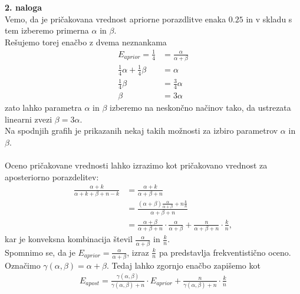 \documentclass[a4paper,11pt]{article}
\begin{document}
\noindent
\textbf{2. naloga}
\\
Vemo, da je pričakovana vrednost apriorne porazdlitve enaka $0.25$ in v skladu s tem izberemo primerna $\alpha$ in $\beta$.
\\
Rešujemo torej enačbo z dvema neznankama
\begin{align*}
    E_{aprior} = \frac{1}{4} &= \frac{\alpha}{\alpha + \beta}
    \\
    \frac{1}{4} \alpha + \frac{1}{4} \beta &= \alpha
    \\
    \frac{1}{4} \beta &=\frac{3}{4} \alpha
    \\
    \beta &= 3 \alpha
\end{align*}
zato lahko parametra $\alpha$ in $\beta$ izberemo na neskončno načinov tako, da ustrezata linearni zvezi $ \beta = 3 \alpha$.
\\
Na spodnjih grafih je prikazanih nekaj takih možnosti za izbiro parametrov $\alpha$ in $\beta$.
\\
\\
Oceno pričakovane vrednosti lahko izrazimo kot pričakovano vrednost za aposteriorno porazdelitev: 
\begin{align*} 
    \frac{\alpha + k}{\alpha + k + \beta + n - k} &= \frac{\alpha + k}{\alpha + \beta + n} 
    \\
    &= \frac{(\alpha + \beta) \frac{\alpha}{\alpha + \beta} + n \frac{k}{n}}{\alpha + \beta + n}
    \\
    &= \frac{\alpha + \beta}{\alpha + \beta + n} \cdot \frac{\alpha}{\alpha + \beta} + \frac{n}{\alpha + \beta + n} \cdot \frac{k}{n},
\end{align*}
kar je konveksna kombinacija števil $\frac{\alpha}{\alpha + \beta}$ in $\frac{k}{n}$.
\\
Spomnimo se, da je $E_{aprior} = \frac{\alpha}{\alpha + \beta}$, izraz $\frac{k}{n}$ pa predstavlja frekventistično oceno. Označimo $\gamma(\alpha, \beta) = \alpha + \beta$. Tedaj lahko zgornjo enačbo zapišemo kot
\begin{align*} 
    E_{apost} = \frac{\gamma(\alpha, \beta)}{\gamma(\alpha, \beta)+ n} \cdot E_{aprior} + \frac{n}{\gamma(\alpha, \beta)+ n} \cdot \frac{k}{n}
\end{align*}
\end{document}
